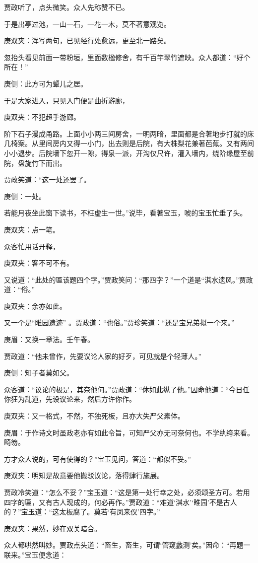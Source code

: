 \begin{parag}
    贾政听了，点头微笑。众人先称赞不已。
\end{parag}


\begin{parag}
    于是出亭过池，一山一石，一花一木，莫不著意观览。\begin{note}庚双夹：浑写两句，已见经行处愈远，更至北一路矣。\end{note}忽抬头看见前面一带粉垣，里面数楹修舍，有千百竿翠竹遮映。众人都道：“好个所在！”\begin{note}庚侧：此方可为颦儿之居。\end{note}于是大家进入，只见入门便是曲折游廊，\begin{note}庚双夹：不犯超手游廊。\end{note}阶下石子漫成甬路。上面小小两三间房舍，一明两暗，里面都是合著地步打就的床几椅案。从里间房内又得一小门，出去则是后院，有大株梨花兼著芭蕉。又有两间小小退步。后院墙下忽开一隙，得泉一派，开沟仅尺许，灌入墙内，绕阶缘屋至前院，盘旋竹下而出。
\end{parag}


\begin{parag}
    贾政笑道：“这一处还罢了。\begin{note}庚侧：一处。\end{note}若能月夜坐此窗下读书，不枉虚生一世。”说毕，看著宝玉，唬的宝玉忙垂了头。\begin{note}庚双夹：点一笔。\end{note}众客忙用话开释，\begin{note}庚双夹：客不可不有。\end{note}又说道：“此处的匾该题四个字。”贾政笑问：“那四字？”一个道是“淇水遗风。”贾政道：“俗。”\begin{note}庚双夹：余亦如此。\end{note}又一个是“睢园遗迹” 。贾政道：“也俗。”贾珍笑道：“还是宝兄弟拟一个来。”\begin{note}庚眉：又换一章法。壬午春。\end{note}贾政道：“他未曾作，先要议论人家的好歹，可见就是个轻薄人。”\begin{note}庚侧：知子者莫如父。\end{note}众客道：“议论的极是，其奈他何。”贾政道：“休如此纵了他。”因命他道：“今日任你狂为乱道，先设议论来，然后方许你作。\begin{note}庚双夹：又一格式，不然，不独死板，且亦大失严父素体。\end{note}\begin{note}庚眉：于作诗文时虽政老亦有如此令旨，可知严父亦无可奈何也。不学纨绔来看。畸笏。\end{note}方才众人说的，可有使得的？”宝玉见问，答道：“都似不妥。”\begin{note}庚双夹：明知是故意要他搬驳议论，落得肆行施展。\end{note}贾政冷笑道：“怎么不妥？”宝玉道：“这是第一处行幸之处，必须颂圣方可。若用四字的匾，又有古人现成的，何必再作。”贾政道：“难道‘淇水’‘睢园’不是古人的？”宝玉道：“这太板腐了。莫若‘有凤来仪’四字。”\begin{note}庚双夹：果然，妙在双关暗合。\end{note}众人都哄然叫妙。贾政点头道：“畜生，畜生，可谓‘管窥蠡测’矣。”因命：“再题一联来。”宝玉便念道：
\end{parag}


